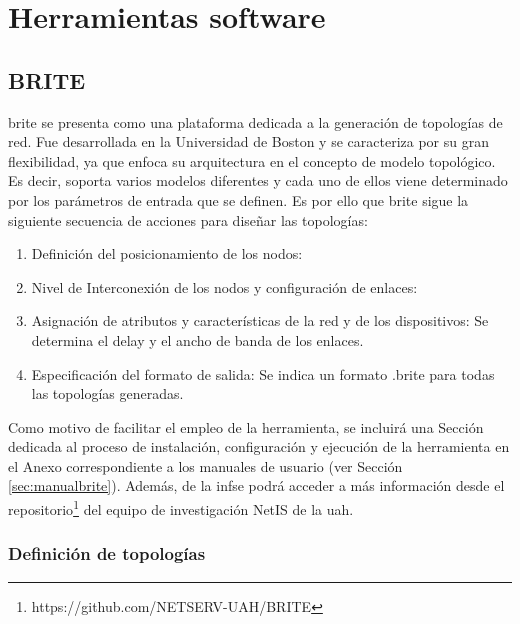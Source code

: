 \section{Herramientas software}
\label{sec:software}

\subsection{BRITE}
\label{sec:brite}

\gls{brite} \cite{brite} se presenta como una plataforma dedicada a la generación de topologías de red. Fue desarrollada en la Universidad de Boston y se caracteriza por su gran flexibilidad, ya que enfoca su arquitectura en el concepto de modelo topológico. Es decir, soporta varios modelos diferentes y cada uno de ellos viene determinado por los parámetros de entrada que se definen. Es por ello que \gls{brite} sigue la siguiente secuencia de acciones para diseñar las topologías:

\vspace{3mm}

\begin{enumerate}
    \item Definición del posicionamiento de los nodos:
    \item Nivel de Interconexión de los nodos y configuración de enlaces:
    \item Asignación de atributos y características de la red y de los dispositivos: Se determina el delay y el ancho de banda de los enlaces.
    \item Especificación del formato de salida: Se indica un formato .brite para todas las topologías generadas.
\end{enumerate}

\vspace{3mm}

Como motivo de facilitar el empleo de la herramienta, se incluirá una Sección dedicada al proceso de instalación, configuración y ejecución de la herramienta en el Anexo correspondiente a los manuales de usuario (ver Sección \ref{sec:manualbrite}). Además, de la infse podrá acceder a más información desde el repositorio\footnote{https://github.com/NETSERV-UAH/BRITE} del equipo de investigación NetIS de la \gls{uah}.

\vspace{3mm}

\subsubsection{Definición de topologías}
\label{sec:param}

